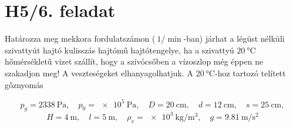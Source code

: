 \newcommand*\circled[1]{\tikz[baseline=(char.base)]{
		\node[shape=circle,draw,inner sep=2pt] (char) {#1};}}

\section*{H5/6. feladat}
Határozza meg mekkora fordulatszámon ($\SI{}{1\per\min}$-ban) járhat a légüst nélküli szivattyút hajtó kulisszás hajtómű hajtótengelye, ha a szivattyú $\SI{20}{\celsius}$ hőmérsékletű vizet szállít, hogy a szívócsőben a vízoszlop még éppen ne szakadjon meg! A veszteségeket elhanyagolhatjuk. A $\SI{20}{\celsius}$-hoz tartozó telített gőznyomás

\begin{equation*}
	p_g=\SI{2338}{\Pa},
	\quad
	p_0=\SI{e5}{\Pa},
	\quad
	D=\SI{20}{\centi\meter},
	\quad
	d=\SI{12}{\centi\meter},
	\quad
	s=\SI{25}{\centi\meter},
\end{equation*}
\begin{equation*}
	H=\SI{4}{\meter},
	\quad
	l=\SI{5}{\meter},
	\quad
	\rho_v=\SI{e3}{\kilogram\per\meter\cubed},
	\quad
	g=\SI{9,81}{\meter\per\s\squared}
\end{equation*}
